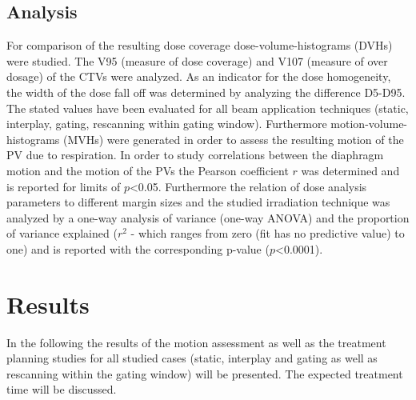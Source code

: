 \documentclass[type=dr, dr=rernat, accentcolor=tud7b,colorbacktitle, bigchapter, openright, twoside, 12pt ]{tudthesis}
\begin{document}
\subsection{Analysis}

For comparison of the resulting dose coverage dose-volume-histograms (DVHs) were studied. The V95 (measure of dose coverage) and V107 (measure 
of over dosage) of the CTVs were analyzed. As an indicator for the dose homogeneity, the width of the dose fall off was determined by analyzing 
the difference D5-D95. The stated values have been evaluated for all beam application techniques (static, interplay, gating, rescanning within 
gating window). Furthermore motion-volume-histograms (MVHs) were generated in order to assess the resulting motion of the PV due to respiration. \newline
\newline
In order to study correlations between the diaphragm motion and the motion of the PVs the Pearson coefficient $r$ was determined and 
is reported for limits of $p$<0.05. Furthermore the relation of dose analysis parameters to different margin sizes and the studied irradiation 
technique was analyzed by a one-way analysis of variance (one-way ANOVA) and the proportion of variance explained ($r^{2}$ - which ranges from 
zero (fit has no predictive value) to one) and is reported with the corresponding p-value ($p$<0.0001). 
 

\newpage

\section{Results}

In the following the results of the motion assessment as well as the treatment planning studies for all studied cases 
(static, interplay and gating as well as rescanning within the gating window) will be presented.  
The expected treatment time will be discussed. 
\end{document}
